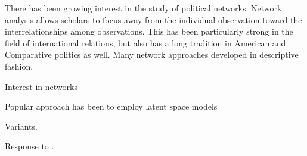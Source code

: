 There has been growing interest in the study of political networks. Network analysis allows scholars to focus away from the individual observation toward the interrelationships among observations. This has been particularly strong in the field of international relations, but also has a long tradition in American and Comparative politics as well.  Many network approaches developed in descriptive fashion, 

Interest in networks

Popular approach has been to employ latent space models

Variants.

Response to \citet{cranmer:etal:2016}.